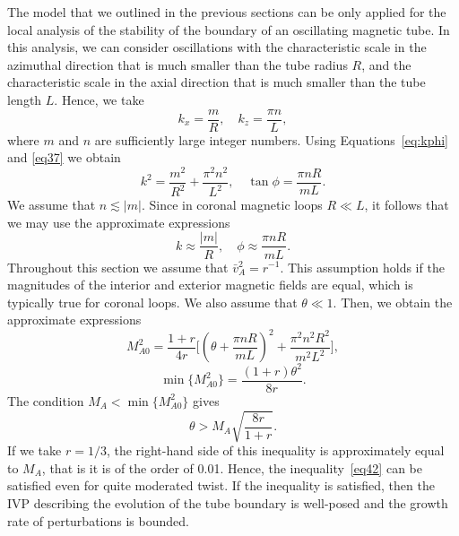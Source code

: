 \documentclass[12pt]{ociamthesis}
\begin{document}
The model that we outlined in the previous sections can be only applied for the local analysis of the stability of the boundary of an oscillating magnetic tube.
In this analysis, we can consider oscillations with the characteristic scale in the azimuthal direction that is much smaller than the tube radius $R$\/, and   the characteristic scale in the axial direction that is much smaller than the tube length $L$\/.
Hence, we take 
%
\begin{equation}
\label{eq37}
k_x = \frac mR, \quad k_z = \frac{\pi n}L,
\end{equation}
%
where $m$ and $n$ are sufficiently large integer numbers. Using Equations~\eqref{eq:kphi} and \eqref{eq37} we obtain 
%
\begin{equation}
\label{eq38}
k^2 = \frac{m^2}{R^2} +  \frac{\pi^2 n^2}{L^2}, \quad 
\tan\phi = \frac{\pi nR}{mL} . 
\end{equation}
%
We assume that $n \lesssim |m|$. Since in coronal magnetic loops $R \ll L$, it follows that we may use the approximate expressions
%
\begin{equation}
\label{eq39}
k \approx \frac{|m|}R , \quad \phi \approx \frac{\pi nR}{mL} . 
\end{equation}
%
Throughout this section we assume that $\bar v_A^2 = r^{-1}$. This assumption holds if the magnitudes of the interior and exterior magnetic fields are equal, which is typically true for coronal loops. We also assume that $\theta \ll 1$.
Then, we obtain the approximate expressions
%
\begin{equation}
\label{eq40}
M_{A 0}^2 = \frac{1 + r}{4r}\bigg[\left(\theta + \frac{\pi nR}{mL}\right)^2 +
\frac{\pi^2 n^2 R^2}{m^2 L^2}\bigg] ,
\end{equation}
%
\begin{equation}
\label{eq41}
\min \{ M_{A0}^2 \} = \frac{(1 + r)\theta^2}{8r} .
\end{equation}
%
The condition $M_A <  \min \{ M_{A0}^2 \}$ gives 
%
\begin{equation}
\label{eq42}
\theta > M_A\sqrt{ \frac{8r}{1 + r}} .
\end{equation}
%
If we take $r = 1/3$, the right-hand side of this inequality is approximately equal to $M_A$, that is it is of the order of 0.01.
Hence, the inequality~\eqref{eq42} can be satisfied even for quite moderated twist.
If the inequality is satisfied, then the IVP describing the evolution of the tube boundary is well-posed and the growth rate of perturbations is bounded.
\end{document}
